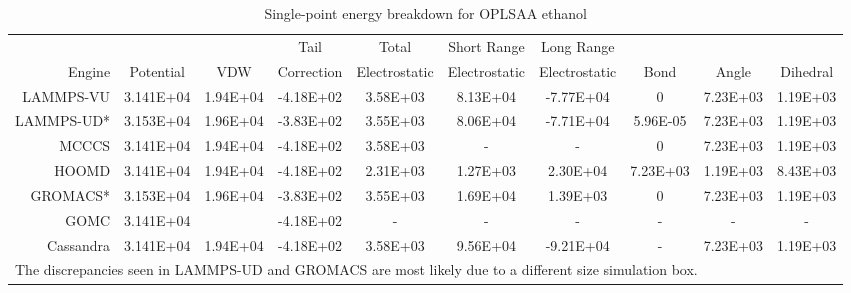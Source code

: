 \begin{landscape}
\begin{table}[h!]
\caption{Single-point energy breakdown for OPLSAA ethanol}\label{tab:sp_ethanol}
\begin{tabular}{rccccccccc}
\hline
& & & Tail & Total & Short Range & Long Range & & & \\
Engine & Potential & VDW & Correction & Electrostatic & Electrostatic & Electrostatic & Bond & Angle & Dihedral \\
\hline
LAMMPS-VU & 3.141E+04 & 1.94E+04 & -4.18E+02 & 3.58E+03 & 8.13E+04 & -7.77E+04 & 0 & 7.23E+03 & 1.19E+03 \\
LAMMPS-UD* & 3.153E+04 & 1.96E+04 & -3.83E+02 & 3.55E+03 & 8.06E+04 & -7.71E+04 & 5.96E-05 & 7.23E+03 & 1.19E+03 \\
MCCCS & 3.141E+04 & 1.94E+04 & -4.18E+02 & 3.58E+03 & - & - & 0 & 7.23E+03 & 1.19E+03 \\
HOOMD & 3.141E+04 & 1.94E+04 & -4.18E+02 & 2.31E+03 & 1.27E+03 & 2.30E+04 & 7.23E+03 & 1.19E+03 & 8.43E+03 \\
GROMACS* & 3.153E+04 & 1.96E+04 & -3.83E+02 & 3.55E+03 & 1.69E+04 & 1.39E+03 & 0 & 7.23E+03 & 1.19E+03 \\
GOMC & 3.141E+04 &  & -4.18E+02 & - & - & - & - & - & - \\
Cassandra & 3.141E+04 & 1.94E+04 & -4.18E+02 & 3.58E+03 & 9.56E+04 & -9.21E+04 & - & 7.23E+03 & 1.19E+03 \\ \hline
\multicolumn{10}{l}{\small *The discrepancies seen in LAMMPS-UD and GROMACS are most likely due to a different size simulation box.}
\end{tabular}
\end{table}

\end{landscape}